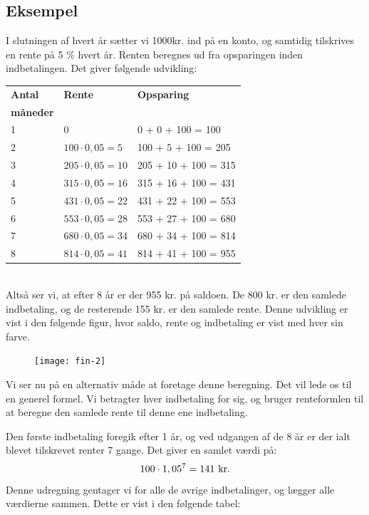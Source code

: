 \documentclass[12pt,oneside,a4paper]{article}
\begin{document}
\begin{tcolorbox}
\subsection{Eksempel}
I slutningen af hvert år sætter vi 1000kr. ind på en konto, og samtidig
tilskrives en rente på 5 $\%$ hvert år. Renten beregnes ud fra
opsparingen inden indbetalingen.  Det giver følgende udvikling:
\\

\begin{tabular}{|l|l|l|}
    \hline
    \textbf{Antal} & \textbf{Rente} & \textbf{Opsparing} \\
    \textbf{måneder} &  & \\
    \hline
    1 & 0 & 0 + 0 + 100 = 100 \\
    \hline
    2 & $100\cdot 0,05 = 5$ & 100 + 5 + 100 = 205 \\
    \hline
    3 & $205\cdot 0,05 = 10$ & 205 + 10 + 100 = 315 \\
    \hline
    4 & $315\cdot 0,05 = 16$ & 315 + 16 + 100 = 431 \\
    \hline
    5 & $431\cdot 0,05 = 22$ & 431 + 22 + 100 = 553 \\
    \hline
    6 & $553\cdot 0,05 = 28$ & 553 + 27 + 100 = 680 \\
    \hline
    7 & $680\cdot 0,05 = 34$ & 680 + 34 + 100 = 814 \\
    \hline
    8 & $814\cdot 0,05 = 41$ & 814 + 41 + 100 = 955 \\
    \hline
\end{tabular}
\\

Altså ser vi, at efter 8 år er der 955 kr. på saldoen. De 800 kr. er den
samlede indbetaling, og de resterende 155 kr. er den samlede rente.
Denne udvikling er vist i den følgende figur, hvor saldo, rente og indbetaling er vist med hver sin farve.
\begin{figure}[H]
    \centering
    \texttt{[image: fin-2]}
\end{figure}
\end{tcolorbox}

Vi ser nu på en alternativ måde at foretage denne beregning. Det vil lede os
til en generel formel. Vi betragter hver indbetaling for sig, og bruger
renteformlen til at beregne den samlede rente til denne ene indbetaling.

Den første indbetaling foregik efter 1 år, og ved udgangen af de 8 år
er der ialt blevet tilskrevet renter 7 gange.  Det giver en samlet værdi på:
\[
    100\cdot 1,05^7 = 141 {\,\,\rm kr.}
\]
Denne udregning gentager vi for alle de øvrige indbetalinger, og lægger alle
værdierne sammen.  Dette er vist i den følgende tabel:
\\
\end{document}
